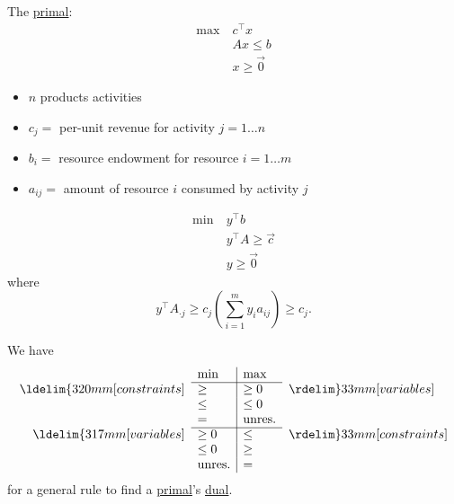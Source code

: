 \begin{prev}
	The \hyperref[def:primal]{primal}:
	\begin{align*}
		\max~ & c^{\top}x     \\
		      & Ax \leq b     \\
		      & x\geq \vec{0}
	\end{align*}
	\begin{itemize}
		\item \(n\) products activities
		\item \(c_{j}=\) per-unit revenue for activity \(j = 1\ldots n\)
		\item \(b_{i}=\) resource endowment for resource \(i = 1\ldots m\)
		\item \(a_{ij}=\) amount of resource \(i\) consumed by activity \(j\)
	\end{itemize}
	\begin{align*}
		\min~ & y^{\top}b               \\
		      & y^{\top} A\geq  \vec{c} \\
		      & y\geq \vec{0}
	\end{align*}
	where \[
		y^{\top}A_{\cdot j}\geq c_{j}(\sum\limits_{i=1}^{m} y_{i}a_{ij}) \geq c_{j}.
	\]
\end{prev}

\begin{note}
	We have
	\[
		\begin{array}{rl|ll}

			                                & \min          & \max          &                                \\
			\cline{2-3}
			\ldelim\{{3}{20mm}[constraints] & \geq          & \geq 0        & \rdelim\}{3}{3mm}[variables]   \\
			                                & \leq          & \leq 0        &                                \\
			                                & =             & \mbox{unres.} &                                \\
			\cline{2-3}
			\ldelim\{{3}{17mm}[variables]   & \geq 0        & \leq          & \rdelim\}{3}{3mm}[constraints] \\
			                                & \leq 0        & \geq          &                                \\
			                                & \mbox{unres.} & =             &                                \\
		\end{array}
	\]
	for a general rule to find a \hyperref[def:primal]{primal}'s \hyperref[def:dual]{dual}.
\end{note}

